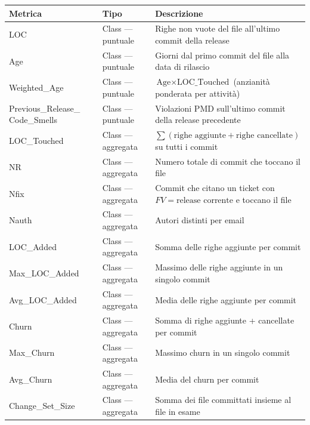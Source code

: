 \begin{table}[h!]
\centering
\small
\begin{tabular}{@{}p{}p{}p{}@{}}
\toprule
\textbf{Metrica} & \textbf{Tipo} & \textbf{Descrizione} \\
\midrule
LOC                          & Class --- puntuale   & Righe non vuote del file all'ultimo commit della release \\
Age                          & Class --- puntuale   & Giorni dal primo commit del file alla data di rilascio \\
Weighted\_Age                & Class --- puntuale   & $\text{Age} \times \text{LOC\_Touched}$ (anzianità ponderata per attività) \\
Previous\_Release\_ \newline Code\_Smells & Class --- puntuale & Violazioni PMD sull'ultimo commit della release precedente \\
\midrule
LOC\_Touched                 & Class --- aggregata & $\sum(\text{righe aggiunte} + \text{righe cancellate})$ su tutti i commit \\
NR                           & Class --- aggregata & Numero totale di commit che toccano il file \\
Nfix                         & Class --- aggregata & Commit che citano un ticket con $FV = \text{release corrente}$ e toccano il file \\
Nauth                        & Class --- aggregata & Autori distinti per email \\
LOC\_Added                   & Class --- aggregata & Somma delle righe aggiunte per commit \\
Max\_LOC\_Added              & Class --- aggregata & Massimo delle righe aggiunte in un singolo commit \\
Avg\_LOC\_Added              & Class --- aggregata & Media delle righe aggiunte per commit \\
Churn                        & Class --- aggregata & Somma di righe aggiunte + cancellate per commit \\
Max\_Churn                   & Class --- aggregata & Massimo churn in un singolo commit \\
Avg\_Churn                   & Class --- aggregata & Media del churn per commit \\
Change\_Set\_Size            & Class --- aggregata & Somma dei file committati insieme al file in esame \\

\end{tabular}
\end{table}
